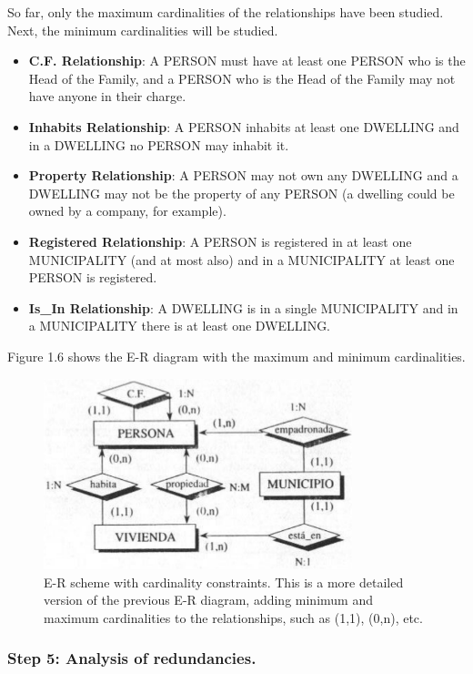 \documentclass{article}
\numberwithin{figure}{section}
\begin{document}
So far, only the maximum cardinalities of the relationships have been studied.  Next, the minimum cardinalities will be studied.

\begin{itemize}
    \item \textbf{C.F. Relationship}: A PERSON must have at least one PERSON who is the Head of the Family, and a PERSON who is the Head of the Family may not have anyone in their charge.
    \item \textbf{Inhabits Relationship}: A PERSON inhabits at least one DWELLING and in a DWELLING no PERSON may inhabit it.
    \item \textbf{Property Relationship}: A PERSON may not own any DWELLING and a DWELLING may not be the property of any PERSON (a dwelling could be owned by a company, for example).
    \item \textbf{Registered Relationship}: A PERSON is registered in at least one MUNICIPALITY (and at most also) and in a MUNICIPALITY at least one PERSON is registered.
    \item \textbf{Is\_In Relationship}: A DWELLING is in a single MUNICIPALITY and in a MUNICIPALITY there is at least one DWELLING.
\end{itemize}

Figure 1.6 shows the E-R diagram with the maximum and minimum cardinalities.

\begin{figure}
    \centering
    \includegraphics[width=0.8\textwidth]{figures/fig6}
    \caption{E-R scheme with cardinality constraints. This is a more detailed version of the previous E-R diagram, adding minimum and maximum cardinalities to the relationships, such as (1,1), (0,n), etc.}
    \label{fig:fig1.6}
\end{figure}

\subsubsection*{Step 5: Analysis of redundancies.}
\end{document}
